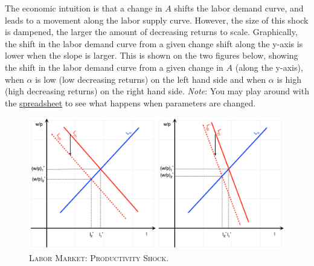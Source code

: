 \documentclass[]{book}
\theoremstyle{definition}
\theoremstyle{definition}
\theoremstyle{definition}
\theoremstyle{remark}
\begin{document}
\begin{enumerate}
  The economic intuition is that a change in \(A\) shifts the labor
  demand curve, and leads to a movement along the labor supply curve.
  However, the size of this shock is dampened, the larger the amount of
  decreasing returns to scale. Graphically, the shift in the labor
  demand curve from a given change shift along the y-axis is lower when
  the slope is larger. This is shown on the two figures below, showing
  the shift in the labor demand curve from a given change in \(A\)
  (along the y-axis), when \(\alpha\) is low (low decreasing returns) on
  the left hand side and when \(\alpha\) is high (high decreasing
  returns) on the right hand side. \emph{Note}: You may play around with
  the
  \href{https://docs.google.com/spreadsheets/d/1h9JJD8K2_IE166gdj78waf0zu4YDY9Rp3r5oiJR_06s/edit?usp=sharing}{spreadsheet}
  to see what happens when parameters are changed.
\end{enumerate}



\begin{figure}

{\centering \includegraphics[width=1\linewidth]{graphsketcher/labor-market-productivity-shock-merged} 

}

\caption{\textsc{Labor Market: Productivity Shock}.}\label{fig:labor-market-prod-shock}
\end{figure}
\end{document}
